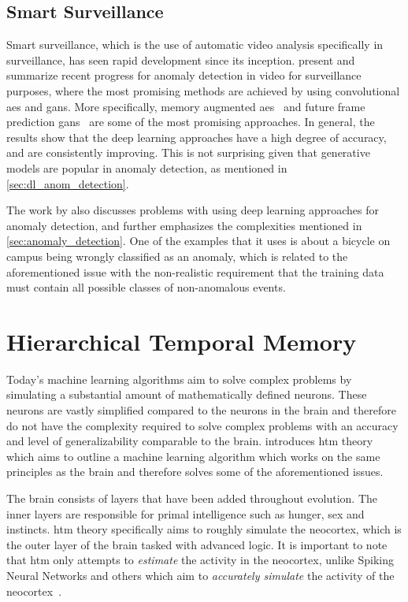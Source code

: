 \subsection{Smart Surveillance}
Smart surveillance, which is the use of automatic video analysis specifically in surveillance, has seen rapid development since its inception. \textcite{anomalyvideo, smart_surveillance_2} present and summarize recent progress for anomaly detection in video for surveillance purposes, where the most promising methods are achieved by using convolutional \glspl*{ae} and \glspl*{gan}. More specifically, memory augmented \glspl*{ae}~\cite{memae} and future frame prediction \glspl*{gan}~\cite{future_frame_prediction} are some of the most promising approaches. In general, the results show that the deep learning approaches have a high degree of accuracy, and are consistently improving. This is not surprising given that generative models are popular in anomaly detection, as mentioned in \autoref{sec:dl_anom_detection}.
\par
The work by \textcite{anomalyvideo} also discusses problems with using deep learning approaches for anomaly detection, and further emphasizes the complexities mentioned in \autoref{sec:anomaly_detection}. One of the examples that it uses is about a bicycle on campus being wrongly classified as an anomaly, which is related to the aforementioned issue with the non-realistic requirement that the training data must contain all possible classes of non-anomalous events.

\section{Hierarchical Temporal Memory}
Today's machine learning algorithms aim to solve complex problems by simulating a substantial amount of mathematically defined neurons. These neurons are vastly simplified compared to the neurons in the brain and therefore do not have the complexity required to solve complex problems with an accuracy and level of generalizability comparable to the brain. \textcite{BAMI} introduces \gls*{htm} theory which aims to outline a machine learning algorithm which works on the same principles as the brain and therefore solves some of the aforementioned issues.\par
The brain consists of layers that have been added throughout evolution. The inner layers are responsible for primal intelligence such as hunger, sex and instincts. \gls*{htm} theory specifically aims to roughly simulate the neocortex, which is the outer layer of the brain tasked with advanced logic. It is important to note that \gls*{htm} only attempts to \emph{estimate} the activity in the neocortex, unlike Spiking Neural Networks and others which aim to \emph{accurately simulate} the activity of the neocortex~\cite{spiking_neural_networks}.

